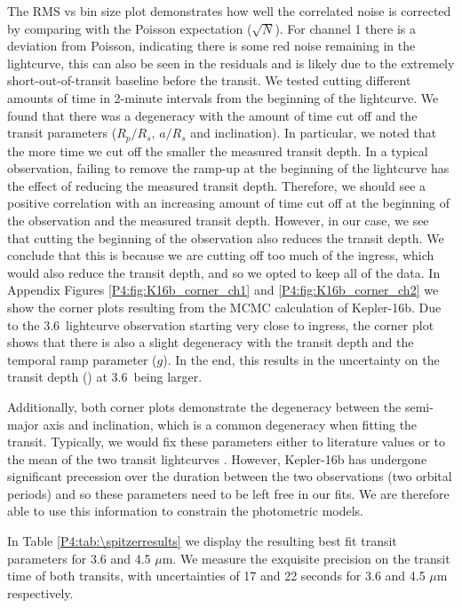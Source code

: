 The RMS vs bin size plot demonstrates how well the correlated noise is corrected by comparing with the Poisson expectation ($\sqrt{N}$). For channel 1 there is a deviation from Poisson, indicating there is some red noise remaining in the lightcurve, this can also be seen in the residuals and is likely due to the extremely short-out-of-transit baseline before the transit. We tested cutting different amounts of time in 2-minute intervals from the beginning of the lightcurve. We found that there was a degeneracy with the amount of time cut off and the transit parameters ($R_p/R_s$, $a/R_s$ and inclination). In particular, we noted that the more time we cut off the smaller the measured transit depth. In a typical \spitzer observation, failing to remove the ramp-up at the beginning of the lightcurve has the effect of reducing the measured transit depth. Therefore, we should see a positive correlation with an increasing amount of time cut off at the beginning of the observation and the measured transit depth. However, in our case, we see that cutting the beginning of the observation also reduces the transit depth. We conclude that this is because we are cutting off too much of the ingress, which would also reduce the transit depth, and so we opted to keep all of the data. In Appendix Figures \ref{P4:fig:K16b_corner_ch1} and \ref{P4:fig:K16b_corner_ch2} we show the corner plots resulting from the MCMC calculation of Kepler-16b. Due to the 3.6\um~lightcurve observation starting very close to ingress, the corner plot shows that there is also a slight degeneracy with the transit depth and the temporal ramp parameter ($g$). In the end, this results in the uncertainty on the transit depth (\rprss) at 3.6\um~being larger.

Additionally, both corner plots demonstrate the degeneracy between the semi-major axis and inclination, which is a common degeneracy when fitting the transit. Typically, we would fix these parameters either to literature values or to the mean of the two \spitzer transit lightcurves \citep[e.g., see][]{Baxter2021}. However, Kepler-16b has undergone significant precession over the duration between the two observations (two orbital periods) and so these parameters need to be left free in our fits. We are therefore able to use this information to constrain the photometric models.

In Table \ref{P4:tab:\spitzerresults} we display the resulting best fit transit parameters for 3.6 and 4.5 $\mu$m. We measure the exquisite precision on the transit time of both transits, with uncertainties of 17 and 22 seconds for 3.6 and 4.5 $\mu$m respectively.

